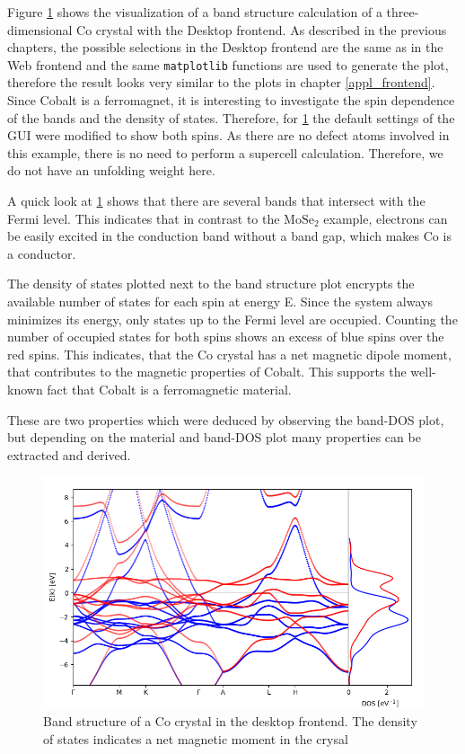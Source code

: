 Figure \ref{example4} shows the visualization of a band structure calculation of
a three-dimensional $\textrm{Co}$ crystal with the Desktop frontend. As described in the previous chapters, the possible selections in the Desktop frontend are the same as in the Web frontend and the same \texttt{matplotlib} functions are used to generate the plot, therefore the result looks very similar to the plots in chapter \ref{appl_frontend}. Since Cobalt is a ferromagnet, it is interesting to investigate the spin dependence of the bands and the density of states. Therefore, for \ref{example4} the default settings of the GUI were modified to show both spins. As there are no defect atoms involved in this example, there is no need to perform a supercell calculation. Therefore, we do not have an unfolding weight here. 

A quick look at \ref{example4} shows that there are several bands that intersect with the Fermi level. This indicates that in contrast to the $\textrm{MoSe}_2$ example, electrons can be easily excited in the conduction band without a band gap, which makes $\textrm{Co}$ is a conductor.

The density of states plotted next to the band structure plot encrypts the available number of states for each spin at energy E. Since the system always minimizes its energy, only states up to the Fermi level are occupied. Counting the number of occupied states for both spins shows an excess of blue spins over the red spins. This indicates, that the $\textrm{Co}$ crystal has a net magnetic dipole moment, that contributes to the magnetic properties of Cobalt. This supports the well-known fact that Cobalt is a ferromagnetic material.

These are two properties which were deduced by observing the band-DOS plot, but
depending on the material and band-DOS plot many properties can be extracted and
derived.

\begin{figure}[htb!]
    \centering
    \includegraphics[width=0.7\linewidth]{fig/image1.png}
    \caption[Band structure of a $\textrm{Co}$ crystal]{Band structure of a $\textrm{Co}$
      crystal in the desktop frontend. The density of states indicates a net magnetic moment in the crysal}
    \label{example4}
\end{figure}



